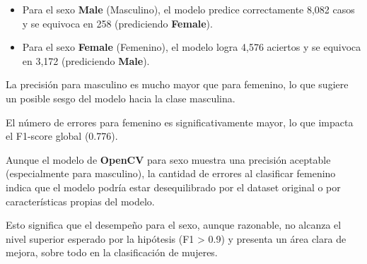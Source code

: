\begin{itemize}
  \item Para el sexo \textbf{Male} (Masculino), el modelo predice correctamente 8,082 casos y se equivoca en 258 (prediciendo \textbf{Female}).
  \item Para el sexo \textbf{Female} (Femenino), el modelo logra 4,576 aciertos y se equivoca en 3,172 (prediciendo \textbf{Male}).
\end{itemize}

La precisión para masculino es mucho mayor que para femenino, lo que sugiere un posible sesgo del modelo hacia la clase masculina.

El número de errores para femenino es significativamente mayor, lo que impacta el F1-score global (0.776).

Aunque el modelo de \textbf{OpenCV} para sexo muestra una precisión aceptable (especialmente para masculino), la cantidad de errores al clasificar femenino indica que el modelo podría estar desequilibrado por el dataset original o por características propias del modelo.

Esto significa que el desempeño para el sexo, aunque razonable, no alcanza el nivel superior esperado por la hipótesis (F1 > 0.9) y presenta un área clara de mejora, sobre todo en la clasificación de mujeres.

